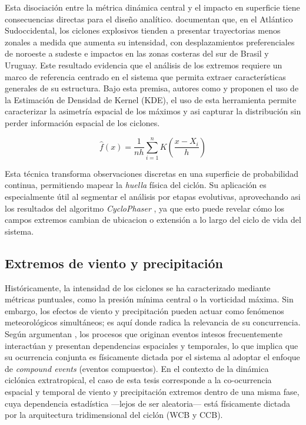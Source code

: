 Esta disociación entre la métrica dinámica central y el impacto en superficie tiene consecuencias directas para el diseño analítico. \citet{andrade2024composite} documentan que, en el Atlántico Sudoccidental, los ciclones explosivos tienden a presentar trayectorias menos zonales a medida que aumenta su intensidad, con desplazamientos preferenciales de noroeste a sudeste e impactos  en las zonas costeras del sur de Brasil y Uruguay. Este resultado evidencia que el análisis de los extremos requiere un marco de referencia centrado en el sistema que permita extraer características generales de su estructura. Bajo esta premisa, autores como \citet{priestley2022improved} y \citet{han2025system} proponen el uso de la Estimación de Densidad de Kernel (KDE), el uso de esta herramienta permite caracterizar la asimetría espacial de los máximos y asi capturar la distribución sin perder información espacial de los ciclones.

\begin{equation}
\hat{f}(x) = \frac{1}{nh} \sum_{i=1}^{n} K\left(\frac{x - X_i}{h}\right)
\end{equation}

Esta técnica transforma observaciones discretas en una superficie de probabilidad continua, permitiendo mapear la \textit{huella} física del ciclón. Su aplicación es especialmente útil al segmentar el análisis por etapas evolutivas, aprovechando asi los resultados del algoritmo \textit{CycloPhaser} \citep{coutodesouza2024new}, ya que esto puede revelar cómo los campos extremos cambian de ubicacion o extensión a lo largo del ciclo de vida del sistema.

\subsection{Extremos de viento y precipitación}\label{subsec:tb_compound_def}

Históricamente, la intensidad de los ciclones se ha caracterizado mediante métricas puntuales, como la presión mínima central o la vorticidad máxima. 
Sin embargo, los efectos de viento y precipitación pueden actuar como fenómenos meteorológicos simultáneos; es aquí donde radica la relevancia de su concurrencia. 
Según argumentan \citet{zscheischler2018future}, los procesos que originan eventos intesos frecuentemente interactúan y presentan dependencias espaciales y temporales, lo que implica que su ocurrencia conjunta es físicamente dictada por el sistema al adoptar el enfoque de \textit{compound events} (eventos compuestos). En el contexto de la dinámica ciclónica extratropical, el caso de esta tesis corresponde a la co-ocurrencia espacial y temporal de viento y precipitación extremos dentro de una misma fase, cuya dependencia estadística —lejos de ser aleatoria— está físicamente dictada por la arquitectura tridimensional del ciclón (WCB y CCB).

